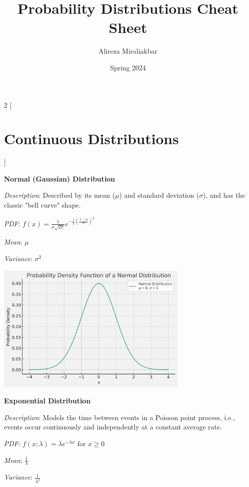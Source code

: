 \documentclass{article}
\title{Probability Distributions Cheat Sheet}
\author{Alireza Miraliakbar}
\date{Spring 2024}
\begin{document}
\maketitle

\begin{multicols}{2}
[
\section*{Continuous Distributions}
]

\begin{mdframed}
\textbf{Normal (Gaussian) Distribution}

\textit{Description}: Described by its mean ($\mu$) and standard deviation ($\sigma$), and has the classic "bell curve" shape.

\textit{PDF}: $f(x) = \frac{1}{\sigma\sqrt{2\pi}} e^{-\frac{1}{2}\left(\frac{x-\mu}{\sigma}\right)^2}$

\textit{Mean}: $\mu$

\textit{Variance}: $\sigma^2$

\begin{center}
  \includegraphics*[width=0.7\textwidth]{normal.png}
\end{center}

\end{mdframed}

\begin{mdframed}
\textbf{Exponential Distribution}

\textit{Description}: Models the time between events in a Poisson point process, i.e., events occur continuously and independently at a constant average rate.

\textit{PDF}: $f(x;\lambda) = \lambda e^{-\lambda x}$ for $x \geq 0$

\textit{Mean}: $\frac{1}{\lambda}$

\textit{Variance}: $\frac{1}{\lambda^2}$


\end{mdframed}
\end{multicols}
\end{document}
